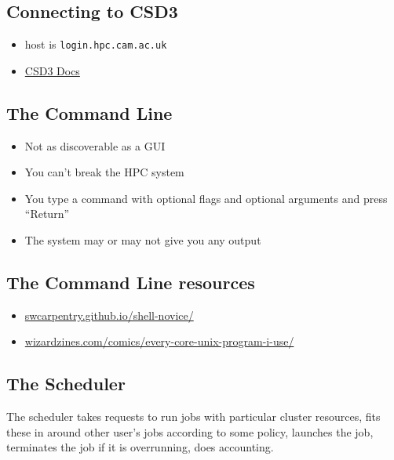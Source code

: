 \documentclass[
  letterpaper,
  DIV=11,
  numbers=noendperiod]{scrartcl}
\providecommand{\tightlist}{%
  \setlength{\itemsep}{0pt}\setlength{\parskip}{0pt}}
\begin{document}
\subsection{Connecting to CSD3}\label{connecting-to-csd3-1}

\begin{itemize}
\tightlist
\item
  host is \texttt{login.hpc.cam.ac.uk}
\item
  \href{https://docs.hpc.cam.ac.uk/hpc/user-guide/quickstart.html}{CSD3
  Docs}
\end{itemize}

\subsection{The Command Line}\label{the-command-line}

\begin{itemize}
\tightlist
\item
  Not as discoverable as a GUI
\item
  You can't break the HPC system
\item
  You type a command with optional flags and optional arguments and
  press ``Return''
\item
  The system may or may not give you any output
\end{itemize}

\subsection{The Command Line
resources}\label{the-command-line-resources}

\begin{itemize}
\tightlist
\item
  \href{https://swcarpentry.github.io/shell-novice/}{swcarpentry.github.io/shell-novice/}
\item
  \href{https://wizardzines.com/comics/every-core-unix-program-i-use/}{wizardzines.com/comics/every-core-unix-program-i-use/}
\end{itemize}

\subsection{The Scheduler}\label{the-scheduler}

The scheduler takes requests to run jobs with particular cluster
resources, fits these in around other user's jobs according to some
policy, launches the job, terminates the job if it is overrunning, does
accounting.
\end{document}
